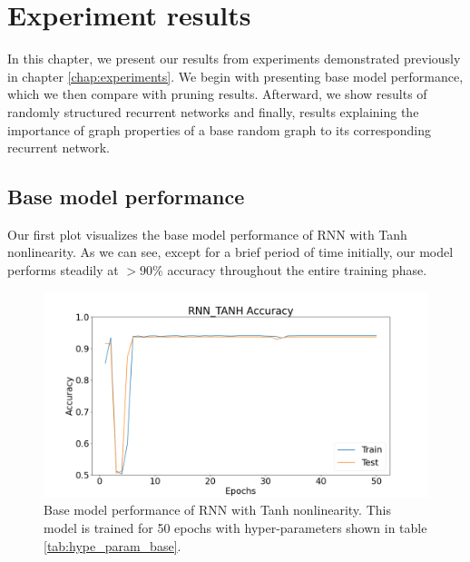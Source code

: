\chapter{Experiment results}\label{chap:results}

In this chapter, we present our results from experiments demonstrated previously in chapter \ref{chap:experiments}. We begin with presenting base model performance, which we then compare with pruning results. Afterward, we show results of randomly structured recurrent networks and finally, results explaining the importance of graph properties of a base random graph to its corresponding recurrent network.


\section{Base model performance}\label{section:base_perf}

Our first plot visualizes the base model performance of RNN with Tanh nonlinearity. As we can see, except for a brief period of time initially, our model performs steadily at $>90\%$ accuracy throughout the entire training phase.

\begin{figure}[h]
	\centering
	\includegraphics[width=0.82\linewidth]{images/results/base_model/rnn_tanh_accuracy.png}
	\caption[RNN\_Tanh base model performance]%
	{Base model performance of RNN with Tanh nonlinearity. This model is trained for 50 epochs with hyper-parameters shown in table \ref{tab:hype_param_base}.}
	\label{fig:rnn_tanh_bm}
\end{figure}

